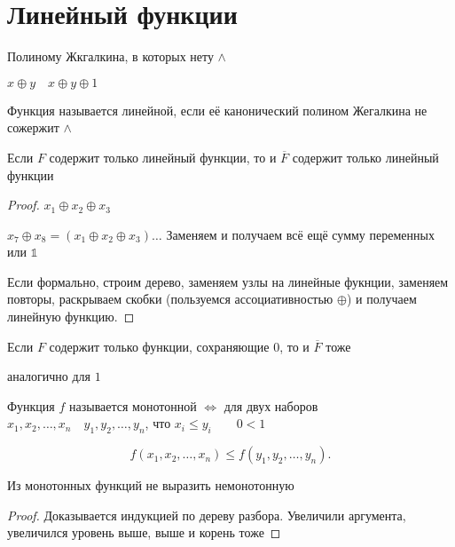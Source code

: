 \documentclass{book}
\theoremstyle{definition}
\begin{document}
    \section{Линейный функции}

    Полиному Жкгалкина, в которых нету $\land$

    $x\oplus y\quad x\oplus y\oplus 1$

    \begin{definition}
        Функция называется линейной, если её канонический полином Жегалкина не сожержит $\land$
    \end{definition}

    \begin{statement}
        Если $F$ содержит только линейный функции, то и $\overline{F}$ содержит только линейный функции
    \end{statement}
    \begin{proof}
        $x_1\oplus x_2 \oplus x_3$

        $x_7\oplus x_8 = (x_1\oplus x_2\oplus x_3)\ldots$ Заменяем и получаем  всё ещё сумму переменных или $\mathbb{1}$

        Если формально, строим дерево, заменяем узлы на линейные фукнции, заменяем повторы, раскрываем скобки (пользуемся ассоциативностью $\oplus$) и получаем линейную функцию.
    \end{proof}

    \begin{statement}
        Если $F$ содержит только функции, сохраняющие $0$, то и $\overline{F}$ тоже

        аналогично для $1$
    \end{statement}

    \begin{definition}
        Функция $f$ называется монотонной $\iff $ для двух наборов $x_1, x_2, \ldots, x_{n} \quad y_1, y_2, \ldots, y_{n} $, что $x_i\leqslant y_i\qquad 0<1$

        \[
            f(x_1, x_2, \ldots, x_{n} ) \leqslant f(y_1,y_2,\ldots,y_{n} )
        .\] 
    \end{definition}

    \begin{statement}
        Из монотонных функций не выразить немонотонную
    \end{statement}
    \begin{proof}
        Доказывается индукцией по дереву разбора. Увеличили аргумента, увеличился уровень выше, выше и корень тоже
    \end{proof}
\end{document}
